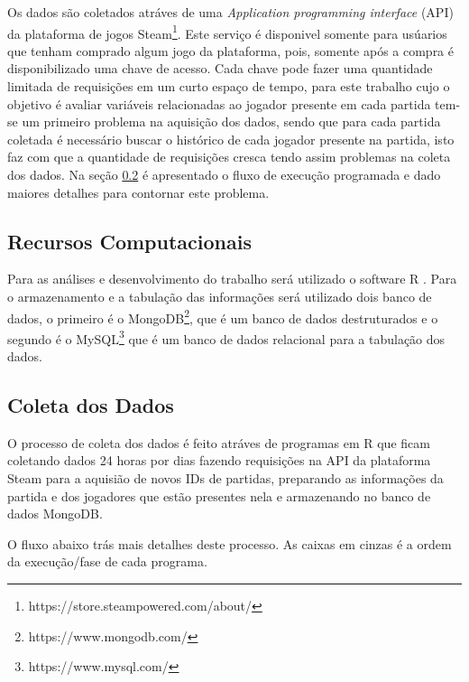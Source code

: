 \documentclass[
12pt,				%
openright,			%
oneside,			%
a4paper,			%
english,			%
brazil,				%
]{abntex2}
\begin{document}
Os dados são coletados atráves de uma \emph{Application programming interface}
(API) da plataforma de jogos Steam\footnote{https://store.steampowered.com/about/}.
Este serviço é disponivel somente para usúarios que tenham comprado algum jogo
da plataforma, pois, somente após a compra é disponibilizado uma chave de
acesso. Cada chave pode fazer uma quantidade limitada de requisições em um curto
espaço de tempo, para este trabalho cujo o objetivo é avaliar variáveis
relacionadas ao jogador presente em cada partida tem-se um primeiro problema na
aquisição dos dados, sendo que para cada partida coletada é necessário buscar o
histórico de cada jogador presente na partida, isto faz com que a quantidade de
requisições cresca tendo assim problemas na coleta dos dados. Na seção \ref{sec:coletadosdados}
 é apresentado o fluxo de execução programada e dado
maiores detalhes para contornar este problema.

\subsection{Recursos Computacionais}

Para as análises e desenvolvimento do trabalho será utilizado o software R \cite{rcoreteam}.
Para o armazenamento e a tabulação das informações será
utilizado dois banco de dados, o primeiro é o
MongoDB\footnote{https://www.mongodb.com/}, que é um banco de dados
destruturados e o segundo é o MySQL\footnote{https://www.mysql.com/} que é
um banco de dados relacional para a tabulação dos dados.


\subsection{Coleta dos Dados}
\label{sec:coletadosdados}

O processo de coleta dos dados é feito atráves de programas em R que ficam
coletando dados 24 horas por dias fazendo requisições na API da plataforma
Steam para a aquisião de novos IDs de partidas, preparando as informações da
partida e dos jogadores que estão presentes nela e armazenando no banco de dados
MongoDB.


O fluxo abaixo trás mais detalhes deste processo. As caixas em cinzas é a ordem
da execução/fase de cada programa.
\end{document}
